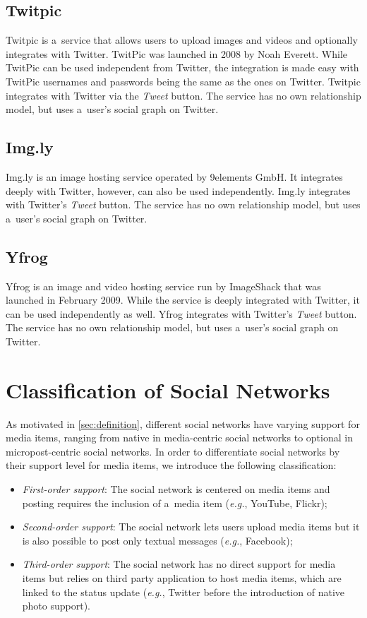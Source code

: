 \subsection{Twitpic}
Twitpic is a~service that allows users to upload images and videos and
optionally integrates with Twitter.
TwitPic was launched in 2008 by Noah Everett.
While TwitPic can be used independent from Twitter, the integration is made easy
with TwitPic usernames and passwords being the same as the ones on Twitter.
Twitpic integrates with Twitter via the \emph{Tweet} button.
The service has no own relationship model, but uses a~user's social graph on Twitter.

\subsection{Img.ly}
Img.ly is an image hosting service operated by 9elements GmbH.
It integrates deeply with Twitter, however, can also be used independently.
Img.ly integrates with Twitter's \emph{Tweet} button. 
The service has no own relationship model, but uses a~user's social graph on Twitter.

\subsection{Yfrog}
Yfrog is an image and video hosting service run by ImageShack that was launched in February 2009.
While the service is deeply integrated with Twitter, it can be used independently as well.
Yfrog integrates with Twitter's \emph{Tweet} button.
The service has no own relationship model, but uses a~user's social graph on Twitter.

\section{Classification of Social Networks} \label{sec:classification-of-social-networks}
As motivated in \autoref{sec:definition}, different social networks have varying support
for media items, ranging from native in media-centric social networks
to optional in micropost-centric social networks.
In order to differentiate social networks by their support level for media items,
we introduce the following classification:

\begin{itemize}
  \item \emph{First-order support}: The social network is centered on media items and posting requires the inclusion of a~media item (\emph{e.g.}, YouTube, Flickr);
  \item \emph{Second-order support}: The social network lets users upload media items but it is also possible to post only textual messages (\emph{e.g.}, Facebook);
  \item \emph{Third-order support}: The social network has no direct support for media items but relies on third party application to host media items,
which are linked to the status update (\emph{e.g.}, Twitter before the introduction of native photo support).
\end{itemize}

